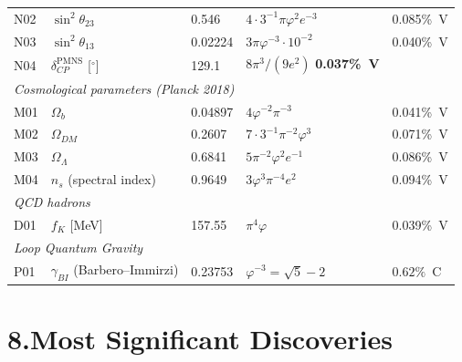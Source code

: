 \documentclass[10pt,a4paper]{article}
\begin{document}
\begin{longtable}{@{}lp{3.0cm}lp{4.5cm}l@{}}
N02 & $\sin^2\theta_{23}$ & 0.546 & $4{\cdot}3^{-1}\pi\varphi^2 e^{-3}$ & 0.085\%~V \\
N03 & $\sin^2\theta_{13}$ & 0.02224 & $3\pi\varphi^{-3} \cdot 10^{-2}$ & 0.040\%~V \\
N04 & $\delta_{CP}^{\mathrm{PMNS}}$ [$^\circ$] & 129.1 & $8\pi^3/(9e^2)$ \textbf{0.037\%~V} \\
\midrule
\multicolumn{5}{l}{\textit{Cosmological parameters (Planck 2018)}}\\
M01 & $\Omega_b$ & 0.04897 & $4\varphi^{-2}\pi^{-3}$ & 0.041\%~V \\
M02 & $\Omega_{DM}$ & 0.2607 & $7{\cdot}3^{-1}\pi^{-2}\varphi^3$ & 0.071\%~V \\
M03 & $\Omega_\Lambda$ & 0.6841 & $5\pi^{-2}\varphi^2 e^{-1}$ & 0.086\%~V \\
M04 & $n_s$ (spectral index) & 0.9649 & $3\varphi^3\pi^{-4}e^2$ & 0.094\%~V \\
\midrule
\multicolumn{5}{l}{\textit{QCD hadrons}}\\
D01 & $f_K$ [MeV] & 157.55 & $\pi^4\varphi$ & 0.039\%~V \\
\midrule
\multicolumn{5}{l}{\textit{Loop Quantum Gravity}}\\
P01 & $\gamma_{BI}$ (Barbero--Immirzi) & 0.23753 & $\varphi^{-3} = \sqrt{5}-2$ & $0.62\%$~C \\
\end{longtable}

\section*{8.\quad Most Significant Discoveries}
\end{document}
